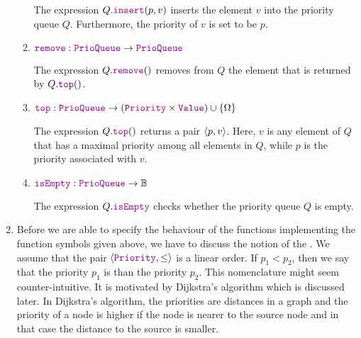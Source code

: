 \begin{Definition}
\begin{enumerate}
\begin{enumerate}
              The expression $Q.\mytt{insert}(p,v)$ inserts the  element $v$ into the priority queue $Q$.
              Furthermore, the priority of $v$ is set to be $p$.
        \item $\mytt{remove}: \mytt{PrioQueue} \rightarrow \mytt{PrioQueue}$

              The expression $Q.\mytt{remove}()$ removes from $Q$ the element that is returned by
              $Q.\mytt{top}()$.
        \item $\mytt{top}: \mytt{PrioQueue}  \rightarrow (\mytt{Priority} \times \mytt{Value}) \cup \{\Omega\}$

              The expression $Q.\mytt{top}()$ returns a pair $\pair(p,v)$.  Here,  $v$ is any
              element of $Q$ that has a  maximal priority among all elements in $Q$, while $p$ is
              the priority associated with $v$. 
        \item $\mytt{isEmpty}: \mytt{PrioQueue} \rightarrow \mathbb{B}$

              The expression $Q.\mytt{isEmpty}$ checks whether the priority queue $Q$ is empty.
        \end{enumerate}
\item Before we are able to specify the behaviour of the functions implementing the function symbols
      given above, we have to discuss the notion of the .  We assume that the pair
      $\langle \mytt{Priority}, \leq \rangle$  is a linear order.
      If  $p_1 < p_2$, then we say that the priority $p_1$ is  than the priority $p_2$.  This
      nomenclature might seem counter-intuitive.  It is motivated by 
      Dijkstra's algorithm which is discussed later.  In Dijkstra's algorithm, the priorities are
      distances in a graph and the priority of a node is higher if the node is nearer to the source
      node and in that case the distance to the source is smaller.


\end{enumerate}
\end{Definition}
